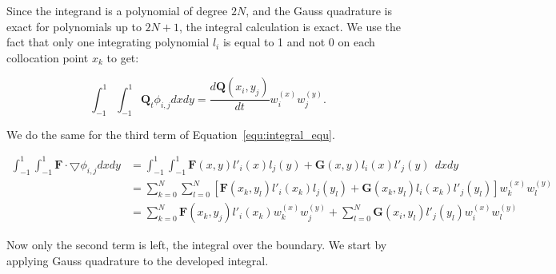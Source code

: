 Since the integrand is a polynomial of degree $2 N$, and the Gauss quadrature is exact for
polynomials up to $2 N + 1$, the integral calculation is exact. We use the fact that only one integrating
polynomial $l_i$ is equal to 1 and not 0 on each collocation point $x_k$ to get:

\begin{equation} \label{equ:integral_1}
    \int_{-1}^{1}\int_{-1}^{1} \mathbf{Q}_t \phi_{i, j} dx dy 
    = \frac{d\mathbf{Q} \left( x_i, y_j \right)}{dt} w_i^{(x)} w_j^{(y)}.
\end{equation}

We do the same for the third term of Equation~\ref{equ:integral_equ}.

\begin{equation} \label{equ:integral_3}
	\begin{split}
		\int_{-1}^{1}\int_{-1}^{1}\mathbf{F} \cdot \bigtriangledown \phi_{i, j} dx dy 
		&= \int_{-1}^{1}\int_{-1}^{1}\mathbf{F}(x, y) l'_i(x)l_j(y) + \mathbf{G}(x, y) l_i(x) l'_j(y) \:\: dx dy \\ 
		&= \sum_{k = 0}^{N} \sum_{l = 0}^{N}\left [ \mathbf{F}(x_k, y_l)l'_i(x_k)l_j(y_l) + \mathbf{G}(x_k, y_l) l_i(x_k)l'_j(y_l) \right ]w_k^{(x)} w_l^{(y)} \\
		&= \sum_{k = 0}^{N} \mathbf{F}(x_k, y_j)l'_i(x_k)w_k^{(x)} w_j^{(y)} + \sum_{l = 0}^{N}\mathbf{G}(x_i, y_l) l'_j(y_l) w_i^{(x)} w_l^{(y)}
	\end{split}
\end{equation}

Now only the second term is left, the integral over the boundary. We start by applying Gauss
quadrature to the developed integral.

